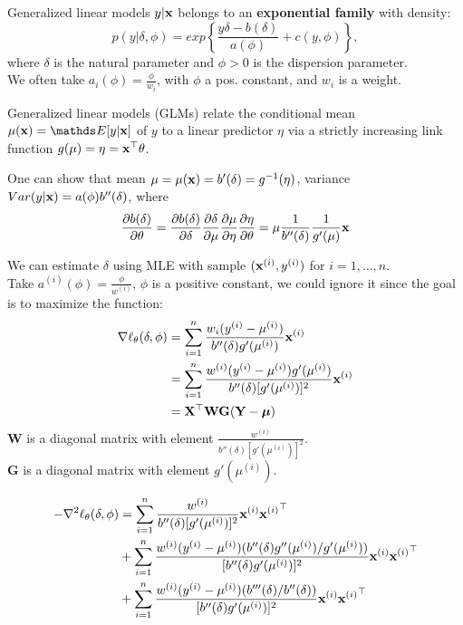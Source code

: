 \documentclass[11pt,compress,t,notes=noshow, xcolor=table]{beamer}
\begin{document}
\begin{vbframe}{Generalized linear models}
$y|\mathbf{x}$ belongs to an \textbf{exponential family} with density:
$$ p(y|\delta, \phi) = exp \left\{ \frac{y\delta-b(\delta)}{a(\phi)} + c(y,\phi) \right\}, $$
where $\delta$ is the natural parameter and $\phi > 0$ is the dispersion parameter.\\
We often take $a_i(\phi) = \frac{\phi}{w_i}$, with $\phi$ a pos. constant, and $w_i$ is a weight.

\lz

Generalized linear models (GLMs) relate the conditional mean $\mu(\xv)=\E[y|\xv]$ of $y$ to a linear predictor $\eta$ via a 
strictly increasing link function $g(\mu)=\eta=\mathbf{x}^\top\theta$.\\

\lz

One can show that mean $\mu = \mu(\mathbf{x})=b'(\delta)=g^{-1}(\eta)$, variance $Var(y|\mathbf{x})=a(\phi)b''(\delta)$, where\\
$$\frac{\partial{b(\delta)}}{\partial{\theta}}
=\frac{\partial{b(\delta)}}{\partial{\delta}}\frac{\partial{\delta}}{\partial{\mu}}\frac{\partial{\mu}}{\partial{\eta}}\frac{\partial{\eta}}{\partial{\theta}}
=\mu \frac{1}{b''(\delta)} \frac{1}{g'(\mu)} \mathbf{x}$$

\framebreak
We can estimate $\delta$ using MLE with sample $(\mathbf{x}^{(i)},y^{(i)})$ for $i=1,\ldots,n$.\\
Take $a^{(i)}(\phi) = \frac{\phi}{w^{(i)}}$, $\phi$ is a positive constant, 
we could ignore it since the goal is to maximize the function:\\
\begin{align*}
\nabla \ell_{\theta}(\delta, \phi) &= \sum\limits_{i=1}^n \frac{w_i(y^{(i)}-\mu^{(i)})}{b''(\delta)g'(\mu^{(i)})}\mathbf{x}^{(i)}\\
 &= \sum\limits_{i=1}^n \frac{w^{(i)}(y^{(i)}-\mu^{(i)})g'(\mu^{(i)})}{b''(\delta)[g'(\mu^{(i)})]^2}\mathbf{x}^{(i)}\\
 &= \mathbf{X}^\top \mathbf{W} \mathbf{G} (\mathbf{Y}-\bm{\mu})
\end{align*}
\lz
$\mathbf{W}$ is a diagonal matrix with element $\frac{w^{(i)}}{b''(\delta)[g'(\mu^{(i)})]^2}$.\\
$\mathbf{G}$ is a diagonal matrix with element $g'(\mu^{(i)})$.\\

\framebreak

\begin{align*}
-\nabla^2 \ell_{\theta}(\delta, \phi)
  & = \sum\limits_{i=1}^n \frac{w^{(i)}}{b''(\delta)[g'(\mu^{(i)})]^2}\mathbf{x}^{(i)}{\mathbf{x}^{(i)}}^\top \\
  & + \sum\limits_{i=1}^n \frac{w^{(i)}(y^{(i)}-\mu^{(i)})(b''(\delta)g''(\mu^{(i)})/g'(\mu^{(i)}))}{[b''(\delta)g'(\mu^{(i)})]^2}\mathbf{x}^{(i)}{\mathbf{x}^{(i)}}^\top \\ 
  & + \sum\limits_{i=1}^n \frac{w^{(i)}(y^{(i)}-\mu^{(i)})(b'''(\delta)/b''(\delta))}{[b''(\delta)g'(\mu^{(i)})]^2}\mathbf{x}^{(i)}{\mathbf{x}^{(i)}}^\top
\end{align*}


\end{vbframe}
\end{document}
